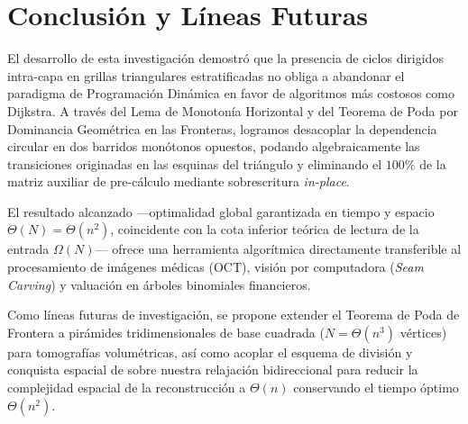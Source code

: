 \section{Conclusión y Líneas Futuras}

El desarrollo de esta investigación demostró que la presencia de ciclos dirigidos intra-capa en grillas triangulares estratificadas no obliga a abandonar el paradigma de Programación Dinámica en favor de algoritmos más costosos como Dijkstra. A través del Lema de Monotonía Horizontal y del Teorema de Poda por Dominancia Geométrica en las Fronteras, logramos desacoplar la dependencia circular en dos barridos monótonos opuestos, podando algebraicamente las transiciones originadas en las esquinas del triángulo y eliminando el $100\%$ de la matriz auxiliar de pre-cálculo mediante sobrescritura \textit{in-place}.

El resultado alcanzado —optimalidad global garantizada en tiempo y espacio $\Theta(N) = \Theta(n^2)$, coincidente con la cota inferior teórica de lectura de la entrada $\Omega(N)$— ofrece una herramienta algorítmica directamente transferible al procesamiento de imágenes médicas (OCT), visión por computadora (\textit{Seam Carving}) y valuación en árboles binomiales financieros.

Como líneas futuras de investigación, se propone extender el Teorema de Poda de Frontera a pirámides tridimensionales de base cuadrada ($N = \Theta(n^3)$ vértices) para tomografías volumétricas, así como acoplar el esquema de división y conquista espacial de \textcite{hirschberg1975} sobre nuestra relajación bidireccional para reducir la complejidad espacial de la reconstrucción a $\Theta(n)$ conservando el tiempo óptimo $\Theta(n^2)$.

